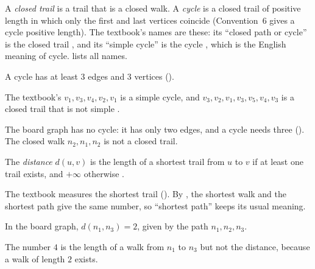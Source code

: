 \begin{definition}\label{def:cycle}
A \emph{closed trail} is a trail that is a closed walk. A \emph{cycle} is a closed trail of positive length in which only the first and last vertices coincide (Convention~6 gives a cycle positive length). The textbook's names are these: its ``closed path or cycle'' is the closed trail \cite[Def.~1.2.14, p.~22]{petrosyan2015grafneri}, and its ``simple cycle'' is the cycle \cite[Def.~1.2.15, p.~22]{petrosyan2015grafneri}, which is the English meaning of cycle.  lists all names.
\end{definition}
\begin{remark}
A cycle has at least $3$ edges and $3$ vertices (). 
\end{remark}
\begin{example}
The textbook's $v_1,v_3,v_4,v_2,v_1$ is a simple cycle, and $v_3,v_2,v_1,v_3,v_5,v_4,v_3$ is a closed trail that is not simple \cite[p.~22]{petrosyan2015grafneri}.
\end{example}
\begin{nonexample}
The board graph has no cycle: it has only two edges, and a cycle needs three (). The closed walk $n_2,n_1,n_2$ is not a closed trail.
\end{nonexample}

\begin{definition}\label{def:distance}
The \emph{distance} $d(u,v)$ is the length of a shortest trail from $u$ to $v$ if at least one trail exists, and $+\infty$ otherwise \cite[Def.~1.2.16, pp.~22--23]{petrosyan2015grafneri}.
\end{definition}
\begin{remark}
The textbook measures the shortest trail (). By , the shortest walk and the shortest path give the same number, so ``shortest path'' keeps its usual meaning.
\end{remark}
\begin{example}
In the board graph, $d(n_1,n_3)=2$, given by the path $n_1,n_2,n_3$.
\end{example}
\begin{nonexample}
The number $4$ is the length of a walk from $n_1$ to $n_3$ but not the distance, because a walk of length $2$ exists.
\end{nonexample}

